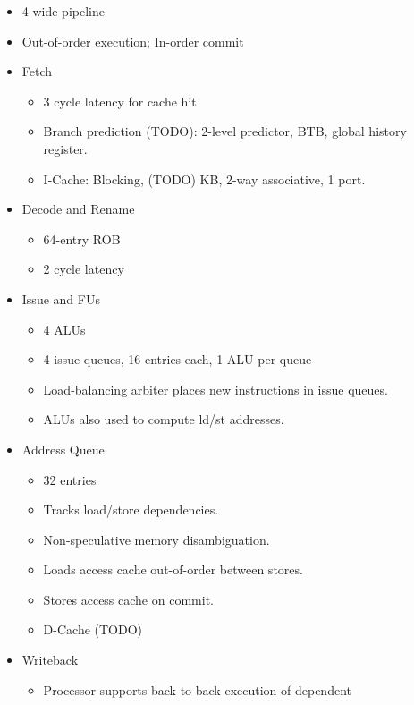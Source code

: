 \documentclass{article}
\begin{document}
\begin{itemize}
    \item 4-wide pipeline
    \item Out-of-order execution; In-order commit
    \item Fetch
        \begin{itemize}
            \item 3 cycle latency for cache hit
            \item Branch prediction (TODO): 2-level predictor, BTB, global
                history register.
            \item I-Cache: Blocking, (TODO) KB, 2-way associative, 1 port.
        \end{itemize}
    \item Decode and Rename
        \begin{itemize}
            \item 64-entry ROB
            \item 2 cycle latency
        \end{itemize}
    \item Issue and FUs
        \begin{itemize}
            \item 4 ALUs
            \item 4 issue queues, 16 entries each, 1 ALU per queue
            \item Load-balancing arbiter places new instructions in issue
                queues.
            \item ALUs also used to compute ld/st addresses.
        \end{itemize}
    \item Address Queue
        \begin{itemize}
            \item 32 entries
            \item Tracks load/store dependencies.
            \item Non-speculative memory disambiguation.
            \item Loads access cache out-of-order between stores.
            \item Stores access cache on commit. 
            \item D-Cache (TODO)
        \end{itemize}
    \item Writeback
        \begin{itemize}
            \item Processor supports back-to-back execution of dependent

\end{itemize}
\end{itemize}
\end{document}
